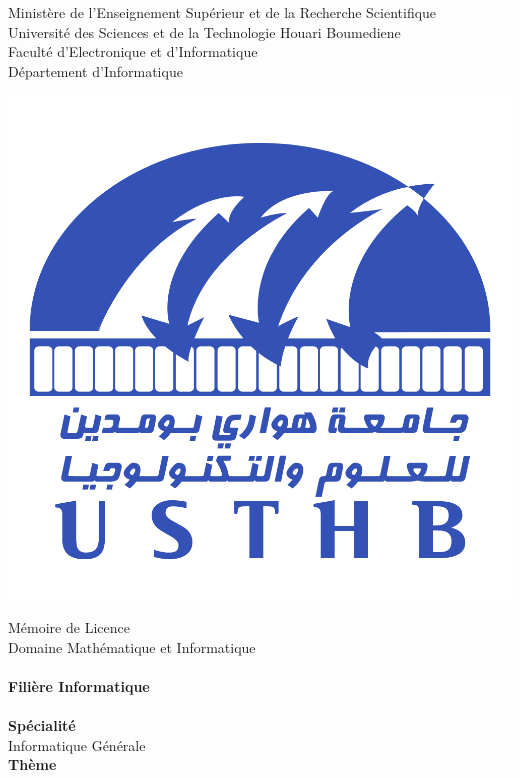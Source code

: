 \documentclass[a4paper,french,10pt,twoside]{report}
\begin{document}

\begin{sloppypar}
\fancyfoot{}
\thispagestyle{empty}
\begin{center}
\normalsize{Ministère de l’Enseignement Supérieur et de la Recherche Scientifique}\\
\normalsize{Université des Sciences et de la Technologie Houari Boumediene}\\
\normalsize{Faculté d’Electronique et d’Informatique}\\
\normalsize{Département d'Informatique}\\
\end{center}
\bigskip
\begin{center}
\includegraphics[scale=0.3]{pictures/usthb.PNG}
\end{center}
\begin{center}
\huge{Mémoire de Licence}\bigskip
\\
\large{Domaine Mathématique et Informatique}\\
\textbf{}\\
\large{\textbf{Filière Informatique}}\\
\textbf{}\\
\large{\textbf{Spécialité}}\bigskip
\\
\large{Informatique Générale }\bigskip
\\
\large{\textbf{Thème}}\bigskip
\end{center}
\begin{center}
\setlength{\shadowsize}{2pt}


\end{center}
\end{sloppypar}
\end{document}
